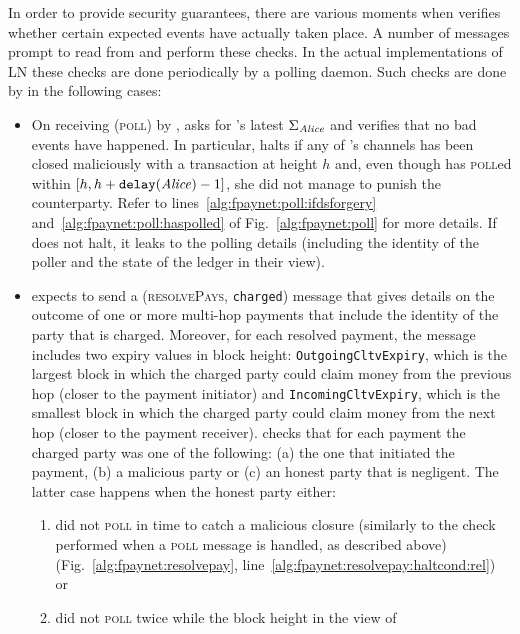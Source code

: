   In order to provide security guarantees, there are various moments when
  \fpaynet{} verifies whether certain expected events have actually taken place.
  A number of messages prompt \fpaynet{} to read from \ledger{} and perform
  these checks. In the actual implementations of LN these checks are done
  periodically by a polling daemon. Such checks are done by \fpaynet{} in the
  following cases:
  \begin{itemize}
    \item On receiving (\textsc{poll}) by \alice, \fpaynet{} asks \ledger{} for
    \alice's latest $\Sigma_{\mathit{Alice}}$ and verifies that no bad events have
    happened. In particular, \fpaynet{} halts if any of \alice's channels has
    been closed maliciously with a transaction at height $h$ and, even though
    \alice{} has \textsc{poll}ed within $[h, h + \mathtt{delay}(\mathit{Alice}) - 1]$,
    she did not manage to punish the counterparty. Refer to
    lines~\ref{alg:fpaynet:poll:ifdsforgery}
    and~\ref{alg:fpaynet:poll:haspolled} of Fig.~\ref{alg:fpaynet:poll} for more
    details. If \fpaynet{} does not halt, it leaks to \simulator{} the polling
    details (including the identity of the poller and the state of the ledger in
    their view).
    \item \fpaynet{} expects \simulator{} to send a (\textsc{resolvePays},
    \texttt{charged}) message that gives details on the outcome of one or more
    multi-hop payments that include the identity of the party that is charged.
    Moreover, for each resolved payment, the message includes two expiry values
    in block height: \texttt{OutgoingCltvExpiry}, which is the largest block in
    which the charged party could claim money from the previous hop (closer to
    the payment initiator) and \texttt{IncomingCltvExpiry}, which is the
    smallest block in which the charged party could claim money from the next
    hop (closer to the payment receiver). \fpaynet{} checks that for each
    payment the charged party was one of the following: (a) the one that
    initiated the payment, (b) a malicious party or (c) an honest party that is
    negligent. The latter case happens when the honest party either:
    \begin{enumerate}
      \item did not \textsc{poll} in time to catch a malicious closure
      (similarly to the check performed when a \textsc{poll} message is handled,
      as described above)
      (Fig.~\ref{alg:fpaynet:resolvepay},
      line~\ref{alg:fpaynet:resolvepay:haltcond:rel}) or
      \item did not \textsc{poll} twice while the block height in the view of

\end{enumerate}
\end{itemize}
